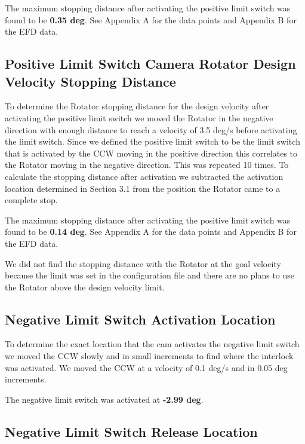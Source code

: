\documentclass[SE,lsstdraft,authoryear,toc]{lsstdoc}
\begin{document}
The maximum stopping distance after activating the positive limit switch
was found to be \textbf{0.35 deg}. See Appendix A for the data points
and Appendix B for the EFD data.

\hypertarget{positive-limit-switch-camera-rotator-design-velocity-stopping-distance}{%
\subsection{Positive Limit Switch Camera Rotator Design Velocity
Stopping
Distance}\label{positive-limit-switch-camera-rotator-design-velocity-stopping-distance}}

To determine the Rotator stopping distance for the design velocity after
activating the positive limit switch we moved the Rotator in the
negative direction with enough distance to reach a velocity of 3.5 deg/s
before activating the limit switch. Since we defined the positive limit
switch to be the limit switch that is activated by the CCW moving in the
positive direction this correlates to the Rotator moving in the negative
direction. This was repeated 10 times. To calculate the stopping
distance after activation we subtracted the activation location
determined in Section 3.1 from the position the Rotator came to a
complete stop.

The maximum stopping distance after activating the positive limit switch
was found to be \textbf{0.14 deg}. See Appendix A for the data points
and Appendix B for the EFD data.

We did not find the stopping distance with the Rotator at the goal
velocity because the limit was set in the configuration file and there
are no plans to use the Rotator above the design velocity limit.

\hypertarget{negative-limit-switch-activation-location}{%
\subsection{Negative Limit Switch Activation
Location}\label{negative-limit-switch-activation-location}}

To determine the exact location that the cam activates the negative
limit switch we moved the CCW slowly and in small increments to find
where the interlock was activated. We moved the CCW at a velocity of 0.1
deg/s and in 0.05 deg increments.

The negative limit switch was activated at \textbf{-2.99 deg}.

\hypertarget{negative-limit-switch-release-location}{%
\subsection{Negative Limit Switch Release
Location}\label{negative-limit-switch-release-location}}
\end{document}
